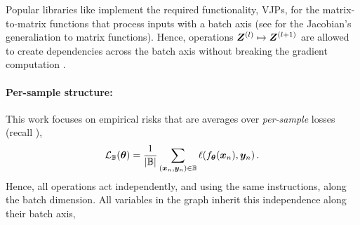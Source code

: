 Popular libraries like \pytorch implement the required functionality, VJPs, for
the matrix-to-matrix functions that process inputs with a batch axis (see
 for the Jacobian's generaliation to matrix
functions). Hence, operations ${\bm{Z}}^{(l)} \mapsto {\bm{Z}}^{(l+1)}$ are allowed to
create dependencies across the batch axis without breaking the gradient
computation%
.

\paragraph{Per-sample structure:} This work focuses on empirical risks that are
averages over \emph{per-sample} losses (recall
),
\begin{align*}
  {\mathcal{L}}_{{\mathbb{B}}}({\bm{\theta}})
  =
  \frac{1}{|{\mathbb{B}}|}
  \sum_{({\bm{x}}_n, {\bm{y}}_n) \in {\mathbb{B}}}
  \ell(f_{{\bm{\theta}}}({\bm{x}}_n), {\bm{y}}_n)\,.
\end{align*}
Hence, all operations act independently, and using the same instructions, along
the batch dimension. All variables in the graph inherit this independence along
their batch axis,
